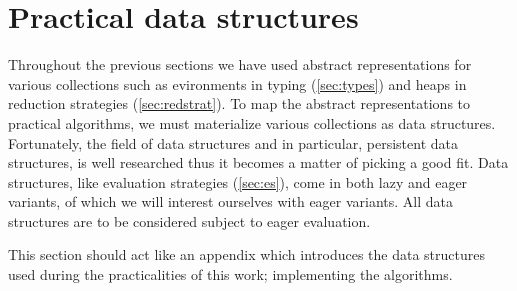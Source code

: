 \chapter{Practical data structures}
Throughout the previous sections we have used abstract representations for various collections such as evironments in typing (\autoref{sec:types}) and heaps in reduction strategies (\autoref{sec:redstrat}).
To map the abstract representations to practical algorithms, we must materialize various collections as data structures.
Fortunately, the field of data structures and in particular, persistent data structures, is well researched thus it becomes a matter of picking a good fit.
Data structures, like evaluation strategies (\autoref{sec:es}), come in both lazy and eager variants, of which we will interest ourselves with eager variants.
All data structures are to be considered subject to eager evaluation.

This section should act like an appendix which introduces the data structures used during the practicalities of this work; implementing the algorithms.

\clearpage







%

